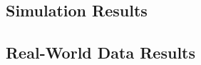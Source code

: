 \documentclass[conference]{IEEEtran}
\begin{document}
\subsection{Simulation Results}

\subsection{Real-World Data Results}
\end{document}
